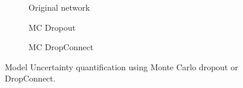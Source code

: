 \begin{figure}[htb]
\begin{subfigure}{0.24\textwidth}
        \caption{Original network}
        \label{fig:mcdrop1}
      \end{subfigure}
      \hfill
      \begin{subfigure}{0.33\textwidth}
        \usebox{\largestimage}
        \caption{MC Dropout}
        \label{fig:mcdrop2}
      \end{subfigure}
      \hfill
      \begin{subfigure}{0.33\textwidth}
        \caption{MC DropConnect}
        \label{fig:mcdrop3}
      \end{subfigure}
      \caption{Model Uncertainty quantification using Monte Carlo dropout or DropConnect.}
      \label{fig:mcdrop}
    \end{figure}
